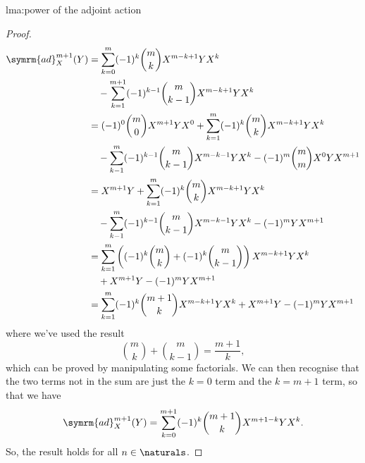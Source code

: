 \documentclass[fleqn]{NotesClass}
\newcommand{\ad}{\symrm{ad}}
\begin{document}
\begin{lma}{}{lma:power of the adjoint action}
\begin{proof}
\begin{align}
                \ad_X^{m+1}(Y) &= \sum_{k=0}^m (-1)^k \binom{m}{k} X^{m-k+1}YX^k\\
                &\quad - \sum_{k=1}^{m+1} (-1)^{k-1} \binom{m}{k-1} X^{m-k+1}YX^k \notag\\
                &= (-1)^0 \binom{m}{0} X^{m+1}YX^0 + \sum_{k=1}^m (-1)^k \binom{m}{k} X^{m-k+1}YX^k \notag\\
                &\quad- \sum_{k-1}^m (-1)^{k-1}\binom{m}{k-1}X^{m-k-1}YX^k - (-1)^m \binom{m}{m} X^0YX^{m+1} \notag\\
                &= X^{m+1}Y + \sum_{k=1}^m (-1)^k \binom{m}{k} X^{m-k+1}YX^k\\
                &\quad- \sum_{k-1}^m (-1)^{k-1}\binom{m}{k-1}X^{m-k-1}YX^k - (-1)^m YX^{m+1} \notag\\
                &= \sum_{k=1}^m \left( (-1)^k \binom{m}{k} + (-1)^k \binom{m}{k - 1} \right) X^{m-k+1}YX^k \notag\\
                &\quad+ X^{m+1}Y - (-1)^mYX^{m+1}\\
                &= \sum_{k=1}^m (-1)^k \binom{m + 1}{k} X^{m-k+1}YX^k + X^{m+1}Y - (-1)^mYX^{m+1}\notag
            \end{align}
            \endgroup
            where we've used the result
            \begin{equation}
                \binom{m}{k} + \binom{m}{k - 1} = \frac{m + 1}{k},
            \end{equation}
            which can be proved by manipulating some factorials.
            We can then recognise that the two terms not in the sum are just the \(k = 0\) term and the \(k = m + 1\) term, so that we have
            \begin{equation}
                \ad_X^{m+1}(Y) = \sum_{k=0}^{m+1} (-1)^k \binom{m+1}{k} X^{m + 1 - k} Y X^k.
            \end{equation}
            So, the result holds for all \(n \in \naturals\).
        \end{proof}
    \end{lma}
    
\end{document}
